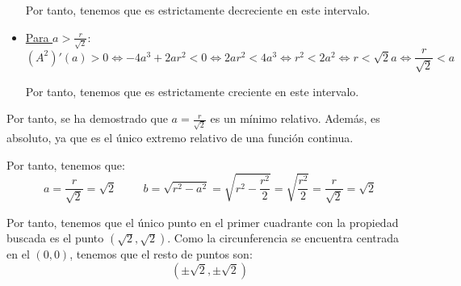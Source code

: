\documentclass[12pt]{article}
\begin{document}
\begin{ejercicio}
\begin{itemize}
    Por tanto, tenemos que es estrictamente decreciente en este intervalo.

    \item \underline{Para $a>\frac{r}{\sqrt{2}}$}:
    \begin{equation*}
        (A^2)'(a)>0 \Longleftrightarrow -4a^3+2ar^2<0 \Longleftrightarrow 2ar^2<4a^3
        \Longleftrightarrow r^2<2a^2
        \Longleftrightarrow r<\sqrt{2}a 
        \Longleftrightarrow \frac{r}{\sqrt{2}}<a 
    \end{equation*}

    Por tanto, tenemos que es estrictamente creciente en este intervalo.
\end{itemize}

Por tanto, se ha demostrado que $a=\frac{r}{\sqrt{2}}$ es un mínimo relativo. Además, es absoluto, ya que es el único extremo relativo de una función continua.

Por tanto, tenemos que:
\begin{equation*}
    a=\frac{r}{\sqrt{2}}=\sqrt{2}
    \hspace{1cm}
    b=\sqrt{r^2-a^2}=\sqrt{r^2-\frac{r^2}{2}} = \sqrt{\frac{r^2}{2}} = \frac{r}{\sqrt{2}}=\sqrt{2}
\end{equation*}

Por tanto, tenemos que el único punto en el primer cuadrante con la propiedad buscada es el punto $(\sqrt{2}, \sqrt{2})$. Como la circunferencia se encuentra centrada en el $(0,0)$, tenemos que el resto de puntos son:
\begin{equation*}
    (\pm \sqrt{2}, \pm \sqrt{2})
\end{equation*}


\end{ejercicio}
\end{document}
